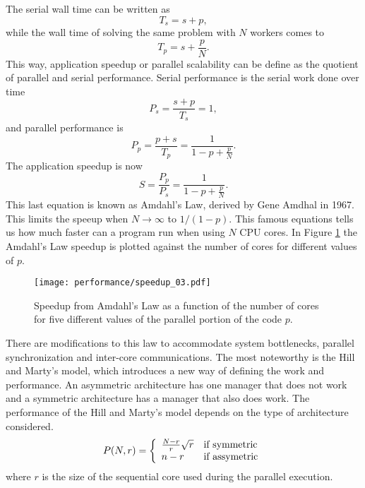 	The serial wall time can be written as
\begin{equation}
	T_s = s + p,
\end{equation}	
while the wall time of solving the same problem with $N$ workers comes to
\begin{equation}
	T_p = s + \frac{p}{N}.
\end{equation}
This way, application speedup or parallel scalability can be define as the quotient of parallel and serial performance. Serial performance is the serial work done over time
\begin{equation}
	P_s = \frac{s+p}{T_s} = 1,
\end{equation} 
and parallel performance is
\begin{equation}
	P_p = \frac{p+s}{T_p} = \frac{1}{1-p+\frac{p}{N}}.
\end{equation}
The application speedup is now
\begin{equation}
	S = \frac{P_p}{P_s} = \frac{1}{1-p+\frac{p}{N}}.
\end{equation}
This last equation is known as Amdahl's Law, derived by Gene Amdhal in 1967. This limits the speeup when $N \rightarrow \infty$ to $1/(1-p)$. This famous equations tells us how much faster can a program run when using $N$ CPU cores. In Figure \ref{amd_law} the Amdahl's Law speedup is plotted against the number of cores for different values of $p$.
\begin{figure}[h]
	\centering
	\texttt{[image: performance/speedup\_03.pdf]}
	\caption{Speedup from Amdahl's Law as a function of the number of cores for five different values of the parallel portion of the code $p$.}
	\label{amd_law}
\end{figure}

	There are modifications to this law to accommodate system bottlenecks, parallel synchronization and inter-core communications. The most noteworthy is the Hill and Marty's model, which introduces a new way of defining the work and performance. An asymmetric architecture has one manager that does not work and a symmetric architecture has a manager that also does work. The performance of the Hill and Marty's model depends on the type of architecture considered. 
\begin{equation}
		P(N, r) = \left\{ \begin{array}{ll}  \frac{N-r}{r} \sqrt{r}  & \mbox{if } \text{symmetric} \\ n-r & \mbox{if } \text{assymetric} \end{array} \right.
\end{equation}
where $r$ is the size of the sequential core used during the parallel execution.


